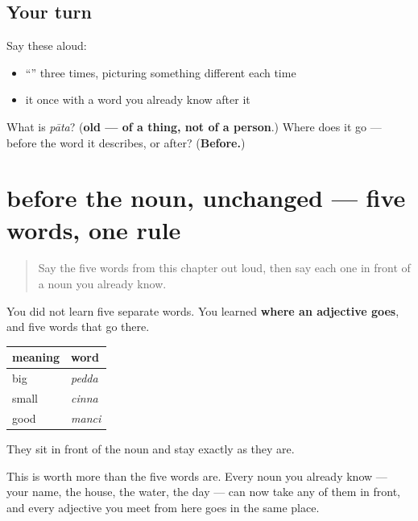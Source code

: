 \subsection*{Your turn}
Say these aloud:

\begin{itemize}
\raggedright
  \item \textquotedblleft{}\textquotedblright{} three times, picturing something different each time
  \item it once with a word you already know after it
\end{itemize}

\begin{tcolorbox}[breakable,colback=teal!4,colframe=teal!35!black,title={Before you move on}]
What is \emph{pāta}? (\textbf{old — of a thing, not of a person}.) Where does it go — before the word it describes, or after? (\textbf{Before.})
\end{tcolorbox}
\section[before the noun, unchanged]{before the noun, unchanged — five words, one rule}

\label{lesson:TE-C42-adjective-system}



\begin{quote}
Say the five words from this chapter out loud, then say each one in front of a noun you already know.
\end{quote}

\begin{grammarlens}[title={Grammar lens: where an adjective goes}]
You did not learn five separate words. You learned \textbf{where an adjective goes}, and five words that go there.

\noindent
\begin{tabularx}{\linewidth}{@{}>{\raggedright\arraybackslash}X>{\raggedright\arraybackslash}X@{}}
\toprule
\textbf{meaning} & \textbf{word} \\
\midrule
big & \textbf{\te{పెద్ద}} \emph{pedda} \\
small & \textbf{\te{చిన్న}} \emph{cinna} \\
good & \textbf{\te{మంచి}} \emph{manci} \\
\bottomrule
\end{tabularx}

They sit in front of the noun and stay exactly as they are.

This is worth more than the five words are. Every noun you already know — your name, the house, the water, the day — can now take any of them in front, and every adjective you meet from here goes in the same place.
\end{grammarlens}

